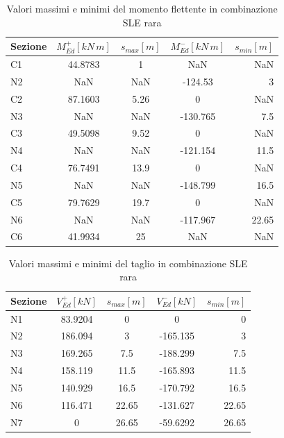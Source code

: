 \begin{table}[ht!]
	\centering
	\caption{Valori massimi e minimi del momento flettente in combinazione SLE rara}
	\label{tab:bendingMoment_sleRara}
    \begin{tabular*}{\textwidth}{l @{\extracolsep{\fill}} cccr}
\toprule
Sezione &  $M_{Ed}^+ [kN\,m]$ &  $s_{max} [m]$ &  $M_{Ed}^- [kN\,m]$ &  $s_{min} [m] $\\
\midrule
C1      &     44.8783 &        1 &         NaN &      NaN \\
N2      &         NaN &      NaN &     -124.53 &        3 \\
C2      &     87.1603 &     5.26 &           0 &      NaN \\
N3      &         NaN &      NaN &    -130.765 &      7.5 \\
C3      &     49.5098 &     9.52 &           0 &      NaN \\
N4      &         NaN &      NaN &    -121.154 &     11.5 \\
C4      &     76.7491 &     13.9 &           0 &      NaN \\
N5      &         NaN &      NaN &    -148.799 &     16.5 \\
C5      &     79.7629 &     19.7 &           0 &      NaN \\
N6      &         NaN &      NaN &    -117.967 &    22.65 \\
C6      &     41.9934 &       25 &         NaN &      NaN \\
\bottomrule
    \end{tabular*}
\end{table}

\begin{table}[ht!]
	\centering
	\caption{Valori massimi e minimi del taglio in combinazione SLE rara}
	\label{tab:shear_sleRara}
    \begin{tabular*}{\textwidth}{l @{\extracolsep{\fill}} cccr}
\toprule
Sezione &  $V_{Ed}^+ [kN]$ &  $s_{max} [m]$ &  $V_{Ed}^- [kN]$ &  $s_{min} [m] $\\
\midrule
N1      &   83.9204 &        0 &         0 &        0 \\
N2      &   186.094 &        3 &  -165.135 &        3 \\
N3      &   169.265 &      7.5 &  -188.299 &      7.5 \\
N4      &   158.119 &     11.5 &  -165.893 &     11.5 \\
N5      &   140.929 &     16.5 &  -170.792 &     16.5 \\
N6      &   116.471 &    22.65 &  -131.627 &    22.65 \\
N7      &         0 &    26.65 &  -59.6292 &    26.65 \\
\bottomrule
    \end{tabular*}
\end{table}




